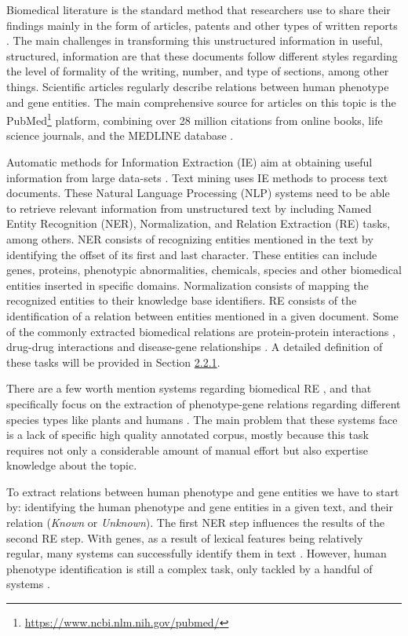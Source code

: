 \documentclass[11pt]{article}
\begin{document}
Biomedical literature is the standard method that researchers use to share their findings mainly in the form of articles, patents and other types of written reports \cite{P99-1001}. The main challenges in transforming this unstructured information in useful, structured, information are that these documents follow different styles regarding the level of formality of the writing, number, and type of sections, among other things. Scientific articles regularly describe relations between human phenotype and gene entities. The main comprehensive source for articles on this topic is the PubMed\footnote{\url{https://www.ncbi.nlm.nih.gov/pubmed/}} platform, combining over 28 million citations from online books, life science journals, and the MEDLINE database \cite{Greenhalgh180}. 

Automatic methods for Information Extraction (IE) aim at obtaining useful information from large data-sets \cite{REVIEW}. Text mining uses IE methods to process text documents. These Natural Language Processing (NLP) systems need to be able to retrieve relevant information from unstructured text by including Named Entity Recognition (NER), Normalization, and Relation Extraction (RE) tasks, among others. NER consists of recognizing entities mentioned in the text by identifying the offset of its first and last character. These entities can include genes, proteins, phenotypic abnormalities, chemicals, species and other biomedical entities inserted in specific domains. Normalization consists of mapping the recognized entities to their knowledge base identifiers. RE consists of the identification of a relation between entities mentioned in a given document. Some of the commonly extracted biomedical relations are protein-protein interactions \cite{PROTEIN-PROTEIN}, drug-drug interactions \cite{BOLSTM} and disease-gene relationships \cite{DISEASE-GENE}. A detailed definition of these tasks will be provided in Section \hyperlink{5}{2.2.1}.

There are a few worth mention systems regarding biomedical RE \cite{N18-1080}, and that specifically focus on the extraction of phenotype-gene relations regarding different species types like plants \cite{PLANTS} and humans \cite{HUMANS}. The main problem that these systems face is a lack of specific high quality annotated corpus, mostly because this task requires not only a considerable amount of manual effort but also expertise knowledge about the topic. 

To extract relations between human phenotype and gene entities we have to start by: identifying the human phenotype and gene entities in a given text, and their relation (\textit{Known} or \textit{Unknown}). The first NER step influences the results of the second RE step. With genes, as a result of lexical features being relatively regular, many systems can successfully identify them in text \cite{BANNER}. However, human phenotype identification is still a complex task, only tackled by a handful of systems \cite{IHP}.
\end{document}
